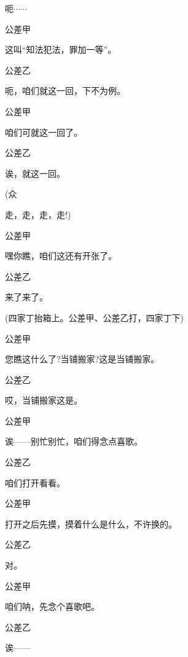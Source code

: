 呃$\cdots{}\cdots{}$

公差甲\hspace{20pt}~

这叫``知法犯法，罪加一等''。

公差乙\hspace{20pt}~

呃，咱们就这一回，下不为例。

公差甲\hspace{20pt}~

咱们可就这一回了。

公差乙\hspace{20pt}~

诶，就这一回。

(众\hspace{40pt}~

走，走，走，走!)

公差甲\hspace{20pt}~

嘿你瞧，咱们这还有开张了。

公差乙\hspace{20pt}~

来了来了。

(四家丁抬箱上。公差甲、公差乙打，四家丁下)

公差甲\hspace{20pt}~

您瞧这什么了?当铺搬家?这是当铺搬家。

公差乙\hspace{20pt}~

哎，当铺搬家这是。

公差甲\hspace{20pt}~

诶------别忙别忙，咱们得念点喜歌。

公差乙\hspace{20pt}~

咱们打开看看。

公差甲\hspace{20pt}~

打开之后先摸，摸着什么是什么，不许换的。

公差乙\hspace{20pt}~

对。

公差甲\hspace{20pt}~

咱们呐，先念个喜歌吧。

公差乙\hspace{20pt}~

诶------

